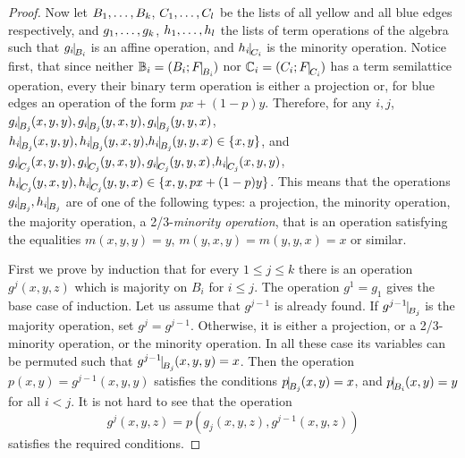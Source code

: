 \documentclass[11pt]{article}
\begin{document}
\begin{proof}
Now let $B _1,\ldots, B _{k}$, $C _1,\ldots, C _{l}$ be the lists of all yellow and all blue
    edges respectively, and $g _1,\ldots, g _{k}$, $h _1,\ldots, h _{l}$ the lists of 
    term operations of the algebra such that $g_i\red{B_i}$ is an
    affine operation, and $h_i\red{C_i}$ is the minority
    operation. Notice first, that since neither
$\zB_i=(B_i;F\red{B_i})$ nor $\zC_i=(C_i;F\red{C_i})$ has a 
    term semilattice operation, every their binary term operation is 
    either a projection or, for blue edges an operation of the form $px+(1-p)y$. 
Therefore, for any $i,j$,
    $g_i\red{B_j}(x,y,y), g_i\red{B_j}(y,x,y), g_i\red{B_j}(y,y,x)$,
    $h_i\red{B_j}(x,y,y), h_i\red{B_j}(y,x,y),\lb h_i\red{B_j}(y,y,x)\in\{x,y\}$, and 
    $g_i\red{C_j}(x,y,y), g_i\red{C_j}(y,x,y), g_i\red{C_j}(y,y,x)$,$h_i\red{C_j}(x,y,y)$, $h_i\red{C_j}(y,x,y), h_i\red{C_j}(y,y,x)
    \in\{x,y, px+(1-p)y\}$. This means that the operations $g_i\red{B_j},
    h_i\red{B_j}$ are of one of the
    following types: a projection, the minority operation, the
    majority operation, a 2/3-{\em minority operation}, that is an
    operation satisfying the equalities $m(x,y,y)=y$,
    $m(y,x,y)=m(y,y,x)=x$ or similar. 

First we prove by induction that for every $1\le j\le k$ there is an
operation $g^j(x,y,z)$ which is majority on $B_i$ for $i\le j$. The
operation $g^1=g_1$ gives the base case of induction. Let us assume
that $g^{j-1}$ is already found. If $g^{j-1}\red{B_j}$ is the majority
operation, set $g^j=g^{j-1}$. Otherwise, it is either a projection, or
a 2/3-minority operation, or the minority operation. In all these case
its variables can be permuted such that
$g^{j-1}\red{B_j}(x,y,y)=x$. Then the operation
$p(x,y)=g^{j-1}(x,y,y)$ satisfies the conditions $p\red{B_j}(x,y)=x$,
and $p\red{B_i}(x,y)=y$ for all $i<j$. It is not hard to see that the
operation
$$
g^j(x,y,z)=p(g_j(x,y,z),g^{j-1}(x,y,z))
$$
satisfies the required conditions. 


\end{proof}
\end{document}
